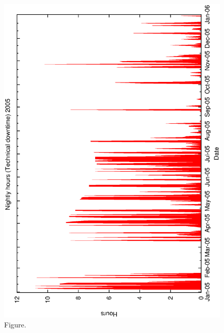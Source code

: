 \documentclass[12pt,a4paper]{article}
\begin{document}
\begin{figure}[htbp]
 \begin{center}
  \includegraphics[scale=1.0, angle=0]{figures/met_nightly_stats_tech2005.eps}
 \end{center}
  \caption[Figure.]
{Figure.}
\end{figure}
\clearpage
\end{document}
